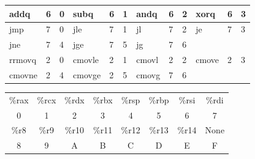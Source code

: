 {\begin{center}
\tablefirsthead{}
\tablelasttail{}
\begin{supertabular}{C{30pt}|C{10pt}|C{10pt}|C{30pt}|C{10pt}|C{10pt}|C{30pt}|C{10pt}|C{10pt}|C{30pt}|C{10pt}|C{10pt}}\toprule
addq & 6 & 0 & subq & 6 & 1 & andq & 6 & 2 & xorq & 6 & 3\\\midrule
jmp & 7 & 0 & jle & 7 & 1 & jl & 7 & 2 & je & 7 & 3\\\cmidrule(lr){1-12}
jne & 7 & 4 & jge & 7 & 5 & jg & 7 & 6\\\midrule
rrmovq & 2 & 0 & cmovle & 2 & 1 & cmovl & 2 & 2 & cmove & 2 & 3\\\cmidrule(lr){1-12}
cmovne & 2 & 4 & cmovge & 2 & 5 & cmovg & 7 & 6\\\bottomrule
\end{supertabular}
\end{center}

\begin{center}
\tablefirsthead{}
\tablelasttail{}
\begin{supertabular}{c|c|c|c|c|c|c|c}\toprule
\%rax & \%rcx & \%rdx & \%rbx & \%rsp & \%rbp & \%rsi & \%rdi\\\cmidrule(lr){1-8}
0 & 1 & 2 & 3 & 4 & 5 & 6 & 7\\\midrule
\%r8 & \%r9 & \%r10 & \%r11 & \%r12 & \%r13 & \%r14 & None\\\cmidrule(lr){1-8}
8 & 9 & A & B & C & D & E & F\\\bottomrule
\end{supertabular}
\end{center}
}
